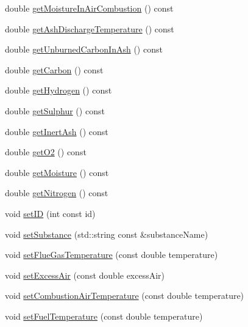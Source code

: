 \begin{DoxyCompactItemize}
double \hyperlink{class_solid_liquid_flue_gas_material_ae3d9780851b8217ed2885753f11ec18b}{get\+Moisture\+In\+Air\+Combustion} () const
\item 
double \hyperlink{class_solid_liquid_flue_gas_material_ab233d4e27397cc74fbe2d3084e4e6f7c}{get\+Ash\+Discharge\+Temperature} () const
\item 
double \hyperlink{class_solid_liquid_flue_gas_material_a53ac34a949168a35297ab3afb9eb2c7b}{get\+Unburned\+Carbon\+In\+Ash} () const
\item 
double \hyperlink{class_solid_liquid_flue_gas_material_a7b8a98111943d30094e2d6950f7f2ec1}{get\+Carbon} () const
\item 
double \hyperlink{class_solid_liquid_flue_gas_material_a26af2edd53c50b071648d03bc6442fb6}{get\+Hydrogen} () const
\item 
double \hyperlink{class_solid_liquid_flue_gas_material_abe35d8ff283bfa5aadcf00f9906025ae}{get\+Sulphur} () const
\item 
double \hyperlink{class_solid_liquid_flue_gas_material_a0549b32b7b5423267d5f59cc96b98127}{get\+Inert\+Ash} () const
\item 
double \hyperlink{class_solid_liquid_flue_gas_material_a08d588e576f605d3f9925cb649e1105e}{get\+O2} () const
\item 
double \hyperlink{class_solid_liquid_flue_gas_material_accf3c8be942d0ba244f6eabab6e7012b}{get\+Moisture} () const
\item 
double \hyperlink{class_solid_liquid_flue_gas_material_a76159a5d9d609f0e0131f7bca3b60ebc}{get\+Nitrogen} () const
\item 
void \hyperlink{class_solid_liquid_flue_gas_material_a6046d06703bd496745121b62eab4f40f}{set\+ID} (int const id)
\item 
void \hyperlink{class_solid_liquid_flue_gas_material_a54be915432c1300c4d8eaf7bf2be361f}{set\+Substance} (std\+::string const \&substance\+Name)
\item 
void \hyperlink{class_solid_liquid_flue_gas_material_ae647700dbff5ccea7938b2117f2c3156}{set\+Flue\+Gas\+Temperature} (const double temperature)
\item 
void \hyperlink{class_solid_liquid_flue_gas_material_a7a3f9f77d267afc05f5fde1da9329ec5}{set\+Excess\+Air} (const double excess\+Air)
\item 
void \hyperlink{class_solid_liquid_flue_gas_material_a626dfbc9ba87abff99e5c5a8204d69c6}{set\+Combustion\+Air\+Temperature} (const double temperature)
\item 
void \hyperlink{class_solid_liquid_flue_gas_material_a420ba1234c5f8c4b93f190b61046a589}{set\+Fuel\+Temperature} (const double temperature)

\end{DoxyCompactItemize}
